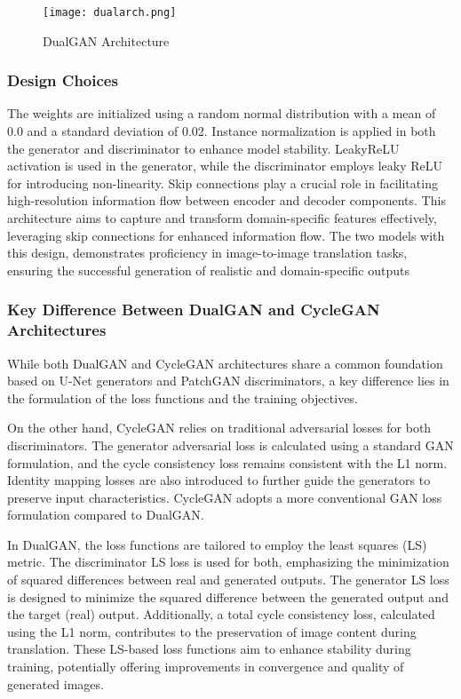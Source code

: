 \documentclass[conference]{IEEEtran}
\begin{document}
\begin{figure}[!ht]
  \centering
  \texttt{[image: dualarch.png]}
  \captionsetup{justification=centering}
  \caption{DualGAN Architecture}
  \label{fig:DualGAN Architecture}
\end{figure}

\subsubsection{Design Choices}
The weights are initialized using a random normal distribution with a mean of 0.0 and a standard deviation of 0.02. Instance normalization is applied in both the generator and discriminator to enhance model stability. LeakyReLU activation is used in the generator, while the discriminator employs leaky ReLU for introducing non-linearity. Skip connections play a crucial role in facilitating high-resolution information flow between encoder and decoder components.
This architecture aims to capture and transform domain-specific features effectively, leveraging skip connections for enhanced information flow. The two models with this design, demonstrates proficiency in image-to-image translation tasks, ensuring the successful generation of realistic and domain-specific outputs

\subsubsection{Key Difference Between DualGAN and CycleGAN Architectures}
While both DualGAN and CycleGAN architectures share a common foundation based on U-Net generators and PatchGAN discriminators, a key difference lies in the formulation of the loss functions and the training objectives.

On the other hand, CycleGAN relies on traditional adversarial losses for both discriminators. The generator adversarial loss is calculated using a standard GAN formulation, and the cycle consistency loss remains consistent with the L1 norm. Identity mapping losses are also introduced to further guide the generators to preserve input characteristics. CycleGAN adopts a more conventional GAN loss formulation compared to DualGAN.

In DualGAN, the loss functions are tailored to employ the least squares (LS) metric. The discriminator LS loss is used for both, emphasizing the minimization of squared differences between real and generated outputs. The generator LS loss is designed to minimize the squared difference between the generated output and the target (real) output. Additionally, a total cycle consistency loss, calculated using the L1 norm, contributes to the preservation of image content during translation. These LS-based loss functions aim to enhance stability during training, potentially offering improvements in convergence and quality of generated images.
\end{document}
